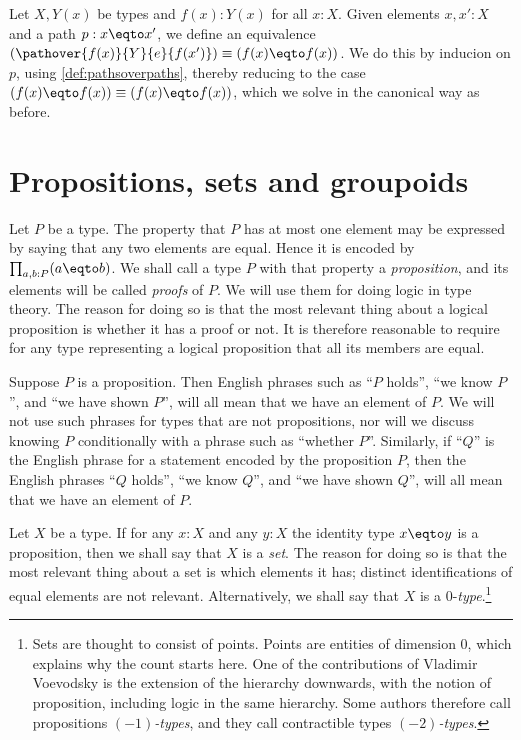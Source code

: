 \begin{definition}\label{def:Dan's-lemma}
Let $X,Y(x)$ be types and $f(x): Y(x)$ for all $x:X$.
Given elements $x,x':X$ and a path $p : x \eqto x'$, we define an equivalence
$(\pathover{f(x)}{Y}{e}{f(x')}) \equiv (f(x) \eqto f(x))$.
We do this by inducion on $p$, using \cref{def:pathsoverpaths},
thereby reducing to the case $(f(x) \eqto f(x)) \equiv (f(x) \eqto f(x))$,
which we solve in the canonical way as before.
\end{definition}


\section{Propositions, sets and groupoids}
\label{sec:props-sets-grpds}

Let $P$ be a type.  The property that $P$ has at most one element may
be expressed by saying that any two elements are equal.
Hence it is encoded by $\prod_{a,b:P} (a \eqto b)$.
We shall call a type $P$ with that property a \emph{proposition},%
and its elements will be called \emph{proofs} of $P$.%
We will use them for doing logic in type theory.
The reason for doing so is that the most relevant
thing about a logical proposition is whether it has a proof or not.
It is therefore reasonable to require for any type representing
a logical proposition that all its members are equal.

Suppose $P$ is a proposition.  Then English phrases such as ``$P$ holds'', ``we know $P$'', and ``we have shown $P$'', will all mean that we
have an element of $P$.  We will not use such phrases for types that are not propositions, nor will we discuss knowing $P$ conditionally with a
phrase such as ``whether $P$''.  Similarly, if ``$Q$'' is the English phrase for a statement encoded by the proposition $P$, then the English
phrases ``$Q$ holds'', ``we know $Q$'', and ``we have shown $Q$'', will all mean that we have an element of $P$.

Let $X$ be a type.  If for any $x:X$ and any $y:X$ the identity
type $x \eqto y$ is a proposition, then we shall say that $X$ is a \emph{set}.%
The reason for doing so is that the most relevant
thing about a set is which elements it has; distinct identifications
of equal elements are not relevant.
Alternatively, we shall say that $X$ is a $0$-\emph{type}.\footnote{%
Sets are thought to consist of points. Points are entities of dimension 0,
which explains why the count starts here.
One of the contributions of Vladimir Voevodsky is the extension of
the hierarchy downwards, with the notion of proposition,
including logic in the same hierarchy.
Some authors therefore call propositions \emph{$(-1)$-types},
and they call contractible types \emph{$(-2)$-types}.}

